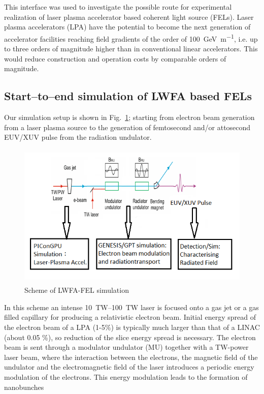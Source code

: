 This interface was used to investigate the possible
route for experimental realization of laser plasma accelerator based coherent
light source (FELs)\cite{Emma2004}. Laser plasma accelerators
(LPA)\cite{Leemans2006,Esarey2009,Tajima1979} have the potential to become the next
generation of accelerator facilities reaching field gradients of the order of
\SI{100}{\giga\electronvolt\per\metre}, i.e. up to three orders of magnitude
higher than in conventional linear accelerators. This would reduce construction
and operation costs by comparable orders of magnitude.

\subsection{Start--to--end simulation of LWFA based FELs\label{sec:lwfa_s2e}}
Our simulation setup is shown in Fig.~\ref{fig:lwfa-setup}; starting from electron
beam generation from a laser plasma source to the generation of femtosecond
and/or attosecond EUV/XUV pulse from the radiation undulator.
%
\begin{figure}[ht]
  \includegraphics[width=5.4165in,height=2.7374in]{figures/lwfafel-img001.png}
  \caption{Scheme of LWFA-FEL simulation}
  \label{fig:lwfa-setup}
\end{figure}
%
In this scheme an intense
\SIrange{10}{100}{\tera\watt}
laser is focused onto a gas jet or a gas filled capillary for producing a
relativistic electron beam. Initial energy spread of the electron beam of a
LPA (1-5\%) is typically much larger than that of a LINAC (about 0.05 \%), so
reduction of the slice energy spread is necessary. The electron beam is sent
through a modulator undulator (MU) together with a TW-power laser beam, where
the interaction between the electrons, the magnetic field of the undulator and
the electromagnetic field of the laser introduces a periodic energy modulation
of the electrons. This energy modulation leads to the formation of nanobunches

